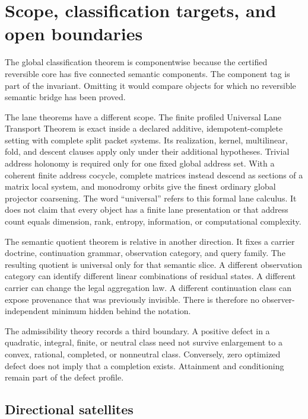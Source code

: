 \section{Scope, classification targets, and open boundaries}
\label{sec:publication-scope}

The global classification theorem is componentwise because the certified reversible core has five connected semantic components.  The component tag is part of the invariant.  Omitting it would compare objects for which no reversible semantic bridge has been proved.

The lane theorems have a different scope.  The finite profiled Universal Lane Transport Theorem is exact inside a declared additive, idempotent-complete setting with complete split packet systems.  Its realization, kernel, multilinear, fold, and descent clauses apply only under their additional hypotheses.  Trivial address holonomy is required only for one fixed global address set.  With a coherent finite address cocycle, complete matrices instead descend as sections of a matrix local system, and monodromy orbits give the finest ordinary global projector coarsening.  The word ``universal'' refers to this formal lane calculus.  It does not claim that every object has a finite lane presentation or that address count equals dimension, rank, entropy, information, or computational complexity.

The semantic quotient theorem is relative in another direction.  It fixes a carrier doctrine, continuation grammar, observation category, and query family.  The resulting quotient is universal only for that semantic slice.  A different observation category can identify different linear combinations of residual states.  A different carrier can change the legal aggregation law.  A different continuation class can expose provenance that was previously invisible.  There is therefore no observer-independent minimum hidden behind the notation.

The admissibility theory records a third boundary.  A positive defect in a quadratic, integral, finite, or neutral class need not survive enlargement to a convex, rational, completed, or nonneutral class.  Conversely, zero optimized defect does not imply that a completion exists.  Attainment and conditioning remain part of the defect profile.



\subsection{Directional satellites}

